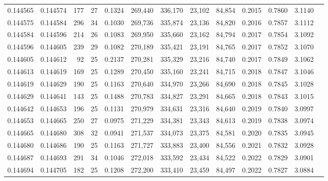 \begin{tabular}{rrrrrrrrrrrrr}
0.144565 & 0.144574 & 177 &  27 &                                     0.1324 & 269,440 & 336,170 &  23,102 &  84,854 & 0.2015 & 0.7860 & 3.1140 \\
0.144575 & 0.144584 & 296 &  34 &                                     0.1030 & 269,736 & 335,874 &  23,136 &  84,820 & 0.2016 & 0.7857 & 3.1112 \\
0.144584 & 0.144596 & 214 &  26 &                                     0.1083 & 269,950 & 335,660 &  23,162 &  84,794 & 0.2017 & 0.7854 & 3.1092 \\
0.144596 & 0.144605 & 239 &  29 &                                     0.1082 & 270,189 & 335,421 &  23,191 &  84,765 & 0.2017 & 0.7852 & 3.1070 \\
0.144605 & 0.144612 &  92 &  25 &                                     0.2137 & 270,281 & 335,329 &  23,216 &  84,740 & 0.2017 & 0.7849 & 3.1062 \\
0.144613 & 0.144619 & 169 &  25 &                                     0.1289 & 270,450 & 335,160 &  23,241 &  84,715 & 0.2018 & 0.7847 & 3.1046 \\
0.144619 & 0.144629 & 190 &  25 &                                     0.1163 & 270,640 & 334,970 &  23,266 &  84,690 & 0.2018 & 0.7845 & 3.1028 \\
0.144629 & 0.144641 & 143 &  25 &                                     0.1488 & 270,783 & 334,827 &  23,291 &  84,665 & 0.2018 & 0.7843 & 3.1015 \\
0.144642 & 0.144653 & 196 &  25 &                                     0.1131 & 270,979 & 334,631 &  23,316 &  84,640 & 0.2019 & 0.7840 & 3.0997 \\
0.144653 & 0.144665 & 250 &  27 &                                     0.0975 & 271,229 & 334,381 &  23,343 &  84,613 & 0.2019 & 0.7838 & 3.0974 \\
0.144665 & 0.144680 & 308 &  32 &                                     0.0941 & 271,537 & 334,073 &  23,375 &  84,581 & 0.2020 & 0.7835 & 3.0945 \\
0.144680 & 0.144686 & 190 &  25 &                                     0.1163 & 271,727 & 333,883 &  23,400 &  84,556 & 0.2021 & 0.7832 & 3.0928 \\
0.144687 & 0.144693 & 291 &  34 &                                     0.1046 & 272,018 & 333,592 &  23,434 &  84,522 & 0.2022 & 0.7829 & 3.0901 \\
0.144694 & 0.144705 & 182 &  25 &                                     0.1208 & 272,200 & 333,410 &  23,459 &  84,497 & 0.2022 & 0.7827 & 3.0884 \\

\end{tabular}
